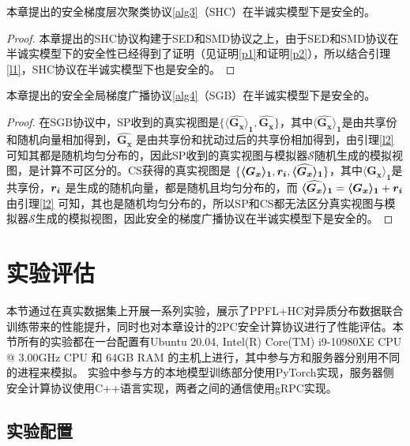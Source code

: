 \begin{theorem}
	本章提出的安全梯度层次聚类协议\ref{alg3}（SHC）在半诚实模型下是安全的。
\end{theorem}

\begin{proof}
	本章提出的SHC协议构建于SED和SMD协议之上，由于SED和SMD协议在半诚实模型下的安全性已经得到了证明（见证明\ref{p1}和证明\ref{p2}），所以结合引理\ref{l1}，SHC协议在半诚实模型下也是安全的。
\end{proof}

\begin{theorem}
	本章提出的安全全局梯度广播协议\ref{alg4}（SGB）在半诚实模型下是安全的。
\end{theorem}

\begin{proof}
	在SGB协议中，SP收到的真实视图是$\{\boldsymbol{\langle \widehat{G_x}\rangle_1}, \boldsymbol{\widehat{G_x}}\}$，其中$\boldsymbol{\langle \widehat{G_x}\rangle_1}$是由共享份和随机向量相加得到，$\boldsymbol{\widehat{G_x}}$ 是由共享份和扰动过后的共享份相加得到，由引理\ref{l2}可知其都是随机均匀分布的，因此SP收到的真实视图与模拟器$\mathcal{S}$随机生成的模拟视图，是计算不可区分的。CS获得的真实视图是 $\{\boldsymbol{\langle G_x\rangle_1}, \boldsymbol{r_i}, \boldsymbol{\langle \widehat{G_x}\rangle_1}\}$，其中$\boldsymbol{\langle G_x\rangle_1}$是共享份，$\boldsymbol{r_i}$ 是生成的随机向量，都是随机且均匀分布的，而 $\boldsymbol{\langle \widehat{G_x}\rangle_1} = \boldsymbol{\langle G_x\rangle_1} + \boldsymbol{r_i}$ 由引理\ref{l2} 可知，其也是随机均匀分布的，所以SP和CS都无法区分真实视图与模拟器$\mathcal{S}$生成的模拟视图，因此安全的梯度广播协议在半诚实模型下是安全的。
\end{proof}

\section{实验评估}\label{4-exp}
本节通过在真实数据集上开展一系列实验，展示了PPFL+HC对异质分布数据联合训练带来的性能提升，同时也对本章设计的2PC安全计算协议进行了性能评估。本节所有的实验都在一台配置有Ubuntu 20.04, Intel(R) Core(TM) i9-10980XE CPU @ 3.00GHz CPU 和 64GB RAM 的主机上进行，其中参与方和服务器分别用不同的进程来模拟。
实验中参与方的本地模型训练部分使用PyTorch实现，服务器侧安全计算协议使用C++语言实现，两者之间的通信使用gRPC实现。

\subsection{实验配置}

